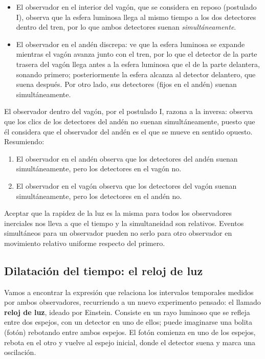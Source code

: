 \begin{itemize}
\item El observador en el interior del vagón, que se considera en reposo
(postulado I), observa que la esfera luminosa llega al mismo tiempo a
los dos detectores dentro del tren, por lo que ambos detectores suenan
\emph{simultáneamente}.
\item El observador en el andén discrepa: ve que la esfera luminosa se
expande mientras el vagón avanza junto con el tren, por lo que el
detector de la parte trasera del vagón llega antes a la esfera luminosa
que el de la parte delantera, sonando primero; posteriormente la esfera
alcanza al detector delantero, que suena después. Por otro lado, sus
detectores (fijos en el andén) suenan simultáneamente.
\end{itemize}

El observador dentro del vagón, por el postulado I, razona a la
inversa: observa que los clics de los detectores del andén no suenan
simultáneamente, puesto que él considera que el observador del andén es
el que se mueve en sentido opuesto. Resumiendo:

\begin{enumerate}[label=\alph*)]
\item El observador en el andén observa que los detectores del andén
suenan simultáneamente, pero los detectores en el vagón no.
\item El observador en el vagón observa que los detectores del vagón
suenan simultáneamente, pero los detectores en el andén no.
\end{enumerate}

\begin{observacion}
Aceptar que la rapidez de la luz es la misma para todos los
observadores inerciales nos lleva a que el tiempo y la simultaneidad son
relativos. Eventos simultáneos para un observador pueden no serlo para
otro observador en movimiento relativo uniforme respecto del primero.
\end{observacion}

\subsection{Dilatación del tiempo: el reloj de luz}

Vamos a encontrar la expresión que relaciona los intervalos temporales
medidos por ambos observadores, recurriendo a un nuevo experimento
pensado: el llamado \textbf{reloj de luz}, ideado por Einstein. Consiste
en un rayo luminoso que se refleja entre dos espejos, con un detector en
uno de ellos; puede imaginarse una bolita (fotón) rebotando entre ambos
espejos. El fotón comienza en uno de los espejos, rebota en el otro y
vuelve al espejo inicial, donde el detector suena y marca una
oscilación.

